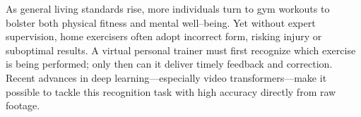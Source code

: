 \documentclass[journal,onecolumn, 11pt]{IEEEtran}
\begin{document}
As general living standards rise, more individuals turn to gym workouts to bolster both physical fitness and mental well–being. Yet without expert supervision, home exercisers often adopt incorrect form, risking injury or suboptimal results. A virtual personal trainer must first recognize which exercise is being performed; only then can it deliver timely feedback and correction. Recent advances in deep learning—especially video transformers—make it possible to tackle this recognition task with high accuracy directly from raw footage.


\end{document}
